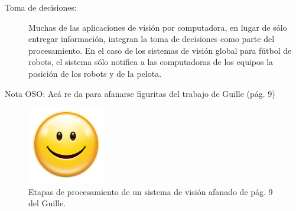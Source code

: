 \begin{description}
	\item[Toma de decisiones:] Muchas de las aplicaciones de visión por
		computadora, en lugar de sólo entregar información, integran la
		toma de decisiones como parte del procesamiento. En el caso de
		los sistemas de visión global para fútbol de robots, el sistema
		sólo notifica a las computadoras de los equipos la posición de
		los robots y de la pelota.

\end{description}

Nota OSO: Acá re da para afanarse figuritas del trabajo de Guille (pág. 9)

\begin{figure}[!h]

	 \includegraphics[width=\textwidth]{img/FALTA.png}

	\caption{Etapas de procesamiento de un sistema de visión afanado de pág.
	9 del Guille.}

	\label{FALTA3}

 \end{figure}
